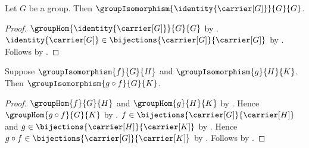 \begin{proposition}\label{identity_group_isomorphism}
    Let $G$ be a group.
    Then
        $\groupIsomorphism{\identity{\carrier[G]}}{G}{G}$.
\end{proposition}
\begin{proof}
    $\groupHom{\identity{\carrier[G]}}{G}{G}$ by
        .
    $\identity{\carrier[G]}\in
        \bijections{\carrier[G]}{\carrier[G]}$ by
        .
    Follows by .
\end{proof}

\begin{theorem}\label{group_isomorphism_composition}
    Suppose $\groupIsomorphism{f}{G}{H}$ and
        $\groupIsomorphism{g}{H}{K}$.
    Then $\groupIsomorphism{g\circ f}{G}{K}$.
\end{theorem}
\begin{proof}
    $\groupHom{f}{G}{H}$ and $\groupHom{g}{H}{K}$ by
        .
    Hence $\groupHom{g\circ f}{G}{K}$ by
        .
    $f\in\bijections{\carrier[G]}{\carrier[H]}$ and
        $g\in\bijections{\carrier[H]}{\carrier[K]}$ by
        .
    Hence $g\circ f\in
        \bijections{\carrier[G]}{\carrier[K]}$ by
        .
    Follows by .
\end{proof}

